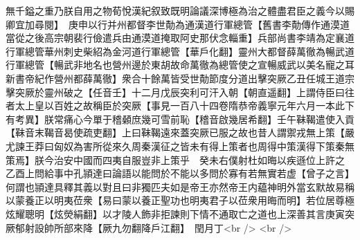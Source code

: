 無千鎰之重乃朕自用之物荀悅漢紀叙致既明論議深博極為治之體盡君臣之義今以賜卿宜加尋閱】　庚申以行并州都督李世勣為通漢道行軍總管【舊書李勣傳作通漠道當從之後高宗朝裴行儉遣兵由通漠道掩取阿史那伏念輜重】兵部尚書李靖為定襄道行軍總管華州刺史柴紹為金河道行軍總管【華戶化翻】靈州大都督薛萬徹為暢武道行軍總管【暢武非地名也營州邊於東胡故命萬徹為總管使之宣暢威武以美名寵之耳新書帝紀作營州都薛萬徹】衆合十餘萬皆受世勣節度分道出擊突厥乙丑任城王道宗擊突厥於靈州破之【任音壬】十二月戊辰突利可汗入朝【朝直遥翻】上謂侍臣曰往者太上皇以百姓之故稱臣於突厥【事見一百八十四卷隋恭帝義寧元年六月一本此下有考異】朕常痛心今單于稽顙庶幾可雪前恥【稽音啟幾居希翻】壬午靺鞨遣使入貢【靺音末鞨音曷使疏吏翻】上曰靺鞨遠來蓋突厥已服之故也昔人謂禦戎無上策【嚴尤諫王莽曰匈奴為害所從來久周秦漢征之皆未有得上策者也周得中策漢得下策秦無策焉】朕今治安中國而四夷自服豈非上策乎　癸未右僕射杜如晦以疾遜位上許之　乙酉上問給事中孔頴達曰論語以能問於不能以多問於寡有若無實若虚【曾子之言】何謂也頴達具釋其義以對且曰非獨匹夫如是帝王亦然帝王内藴神明外當玄默故易稱以蒙養正以明夷莅衆【易曰蒙以養正聖功也明夷君子以莅衆用晦而明】若位居尊極炫耀聰明【炫熒絹翻】以才陵人飾非拒諫則下情不通取亡之道也上深善其言庚寅突厥郁射設帥所部來降【厥九勿翻降戶江翻】　閏月丁<br />
<br />
